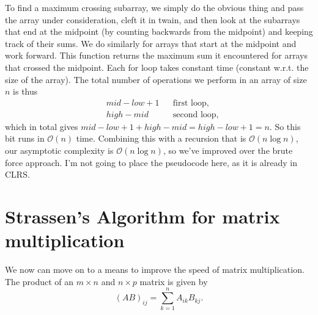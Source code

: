 \documentclass[12pt,english]{article}
\begin{document}
To find a maximum crossing subarray, we simply do the obvious thing and pass the array under consideration, cleft it in twain, and then look at the subarrays that end at the midpoint (by counting backwards from the midpoint) and keeping track of their sums.  We do similarly for arrays that start at the midpoint and work forward.  This function returns the maximum sum it encountered for arrays that crossed the midpoint.  Each for loop takes constant time (constant w.r.t. the size of the array).  The total number of operations we perform in an array of size $n$ is thus
$$
\begin{aligned}
&mid-low + 1			&& \text{first loop,} \\
&high - mid			&& \text{second loop,}
\end{aligned}
$$
which in total gives $mid - low + 1 + high - mid = high - low + 1 = n$.  So this bit runs in $\mathcal{O}(n)$ time. Combining this with a recursion that is $\mathcal{O}(n \log n)$, our asymptotic complexity is $\mathcal{O}(n \log n)$, so we've improved over the brute force approach.  I'm not going to place the pseudocode here, as it is already in CLRS.  

\section{Strassen's Algorithm for matrix multiplication}

We now can move on to a means to improve the speed of matrix multiplication.  The product of an $m \times n$ and $n \times p$ matrix is given by
$$
(AB)_{ij} = \sum_{k=1}^n A_{ik}B_{kj}.
$$
\end{document}
